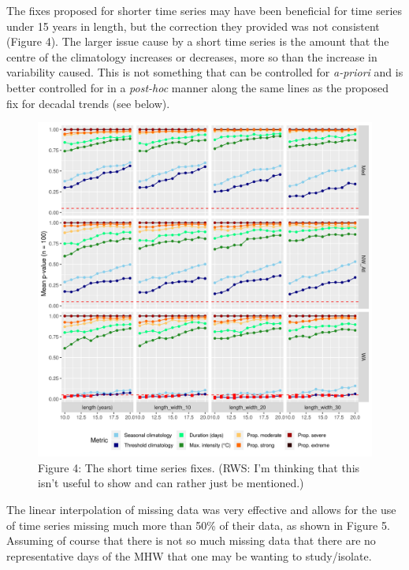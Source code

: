\documentclass[]{article}
\begin{document}
The fixes proposed for shorter time series may have been beneficial for
time series under 15 years in length, but the correction they provided
was not consistent (Figure 4). The larger issue cause by a short time
series is the amount that the centre of the climatology increases or
decreases, more so than the increase in variability caused. This is not
something that can be controlled for \emph{a-priori} and is better
controlled for in a \emph{post-hoc} manner along the same lines as the
proposed fix for decadal trends (see below).

\begin{figure}
\centering
\includegraphics{../output/fig_2_length_only.png}
\caption{Figure 4: The short time series fixes. (RWS: I'm thinking that
this isn't useful to show and can rather just be mentioned.)}
\end{figure}

The linear interpolation of missing data was very effective and allows
for the use of time series missing much more than 50\% of their data, as
shown in Figure 5. Assuming of course that there is not so much missing
data that there are no representative days of the MHW that one may be
wanting to study/isolate.
\end{document}
